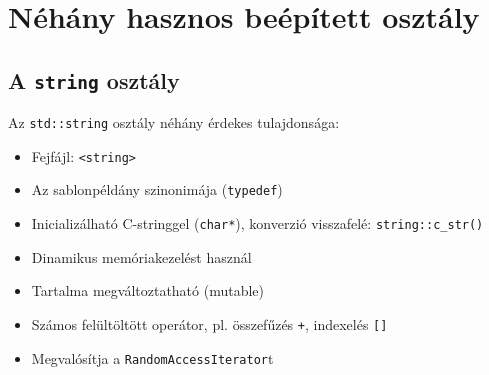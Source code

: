 \section{Néhány hasznos beépített osztály}

\subsection{A \texttt{string} osztály}

\begin{frame}
    Az \texttt{std::string} osztály néhány érdekes tulajdonsága:
    \begin{itemize}
        \item Fejfájl: \texttt{<string>}
        \item Az  sablonpéldány szinonimája (\texttt{typedef})
        \item Inicializálható C-stringgel (\texttt{char*}), konverzió visszafelé: \texttt{string::c\_str()}
        \item Dinamikus memóriakezelést használ
        \item Tartalma megváltoztatható (mutable)
        \item Számos felültöltött operátor, pl. összefűzés \texttt{+}, indexelés \texttt{[]}
        \item Megvalósítja a \texttt{RandomAccessIterator}t
    \end{itemize}
\end{frame}

\begin{frame}
    \begin{exampleblock}{}
        \scriptsize
        
        
    \end{exampleblock}
\end{frame}

